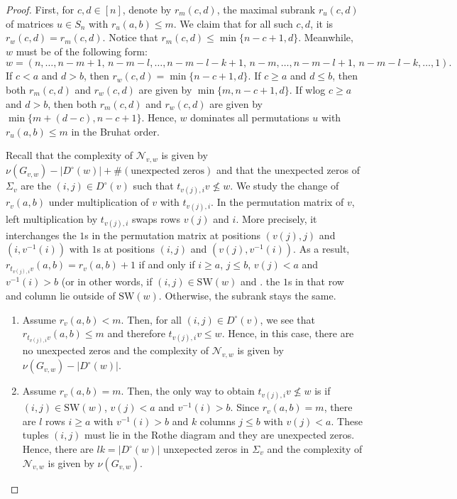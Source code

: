 \documentclass[10pt,a4paper]{amsart}
\newcommand{\Dc}{D^{\circ}}
\newcommand{\Gvwt}{G_{v,w}}
\newcommand{\Nvw}{\mathcal{N}_{v,w}}
\newcommand{\SW}{\mathrm{SW}}
\newcommand{\cn}{\nu}
\newcommand{\rk}{r}
\begin{document}
    \begin{proof}
     First, for $c,d \in [n]$, denote by $\rk_m(c,d)$, the maximal subrank $\rk_u(c,d)$ of matrices $u \in S_n$ with $\rk_u(a,b) \leq m$. We claim that for all such $c,d$, it is $\rk_w(c,d) = \rk_m(c,d)$. Notice that $\rk_m(c,d) \leq \min \{ n-c+1,d \}$. Meanwhile, $w$ must be of the following form:
     $$
    w= (n, \ldots, n-m+1, \, n-m-l, \ldots, n-m-l-k+1, \, n-m, \ldots, n-m-l+1, \, n-m-l-k, \ldots, 1).
$$
     If $c<a$ and $d>b$, then $\rk_w(c,d) = \min \{n-c+1,d \}$. If $c \geq a$ and $d \leq b$, then both $\rk_m(c,d)$ and $\rk_w(c,d)$ are given by $\min \{ m, n-c+1, d \}$.
     If wlog $c \geq a$ and $d>b$, then both $\rk_m(c,d)$ and $\rk_w(c,d)$ are given by $\min \{ m+(d-c), n-c+1 \}$.
     Hence, $w$ dominates all permutations $u$ with $\rk_u(a,b) \leq m$ in the Bruhat order. 
     
    \noindent
    Recall that the complexity of $\Nvw$ is given by $\cn(\Gvwt) - |\Dc(w)| + \# (\textrm{unexpected zeros})$ and that the unexpected zeros of $\Sigma_v$ are the $(i,j) \in \Dc(v)$ such that $t_{v(j),i}v \not\leq w$. We study the change of $\rk_v(a,b)$ under multiplication of $v$ with $t_{v(j),i}$. In the permutation matrix of $v$, left multiplication by $t_{v(j),i}$ swaps rows $v(j)$ and $i$. More precisely, it interchanges the $1$s in the permutation matrix at positions $(v(j),j)$ and $(i, v^{-1}(i))$ with $1$s at positions $(i,j)$ and $(v(j), v^{-1}(i))$. As a result, $\rk_{t_{v(j),i}v}(a,b) = \rk_v(a,b) +1$ if and only if $i \geq a$, $j \leq b$, $v(j)<a$ and $v^{-1}(i) >b$ (or in other words, if $(i,j) \in \SW(w)$ and . 
    the $1$s in that row and column lie outside of $\SW(w)$.
    Otherwise, the subrank stays the same. 

    \begin{enumerate}
        \item Assume $\rk_v(a,b) <m$. Then, for all $(i,j) \in \Dc(v)$, we see that $\rk_{t_{v(j),i}v}(a,b) \leq m$ and therefore $t_{v(j),i}v \leq w$. Hence, in this case, there are no unexpected zeros and the complexity of $\Nvw$ is given by $\cn(\Gvwt) - |\Dc(w)|$.
    \item Assume $\rk_v(a,b) =m$. Then, the only way to obtain $t_{v(j),i}v \not\leq w$ is if $(i,j) \in \SW(w)$, $v(j) <a$ and $v^{-1}(i) >b$. Since $\rk_v(a,b)= m$, there are $l$ rows $i \geq a$ with $v^{-1}(i) >b$ and $k$ columns $j \leq b$ with $v(j) <a$. These tuples $(i,j)$ must lie in the Rothe diagram and they are unexpected zeros. Hence, there are $lk = |\Dc(w)|$ unxepected zeros in $\Sigma_v$ and the complexity of $\Nvw$ is given by $\cn(\Gvwt)$.\qedhere
    \end{enumerate}\end{proof}
\end{document}
